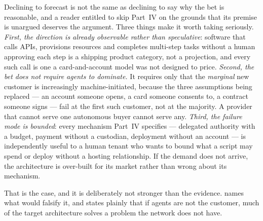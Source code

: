 Declining to forecast is not the same as declining to say why the bet is reasonable, and a reader
entitled to skip Part~IV on the grounds that its premise is unargued deserves the argument. Three
things make it worth taking seriously. \emph{First, the direction is already observable rather than
speculative}: software that calls APIs, provisions resources and completes multi-step tasks without a
human approving each step is a shipping product category, not a projection, and every such call is
one a card-and-account model was not designed to price. \emph{Second, the bet does not require
agents to dominate.} It requires only that the \emph{marginal} new customer is increasingly
machine-initiated, because the three assumptions being replaced --- an account someone opens, a card
someone consents to, a contract someone signs --- fail at the first such customer, not at the
majority. A provider that cannot serve one autonomous buyer cannot serve any. \emph{Third, the
failure mode is bounded}: every mechanism Part~IV specifies --- delegated authority with a budget,
payment without a custodian, deployment without an account --- is independently useful to a human
tenant who wants to bound what a script may spend or deploy without a hosting relationship. If the
demand does not arrive, the architecture is over-built for its market rather than wrong about its
mechanism.

That is the case, and it is deliberately not stronger than the evidence.  names
what would falsify it, and  states plainly that if agents are not the customer,
much of the target architecture solves a problem the network does not have.

